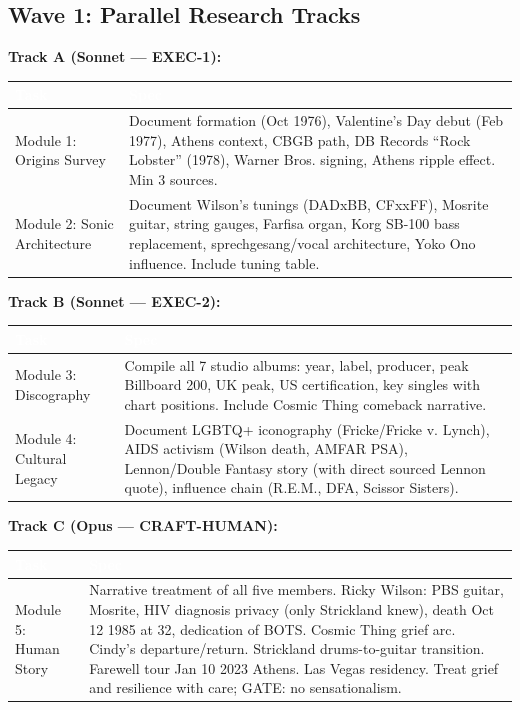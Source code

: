 \documentclass[11pt,letterpaper]{article}
\newcommand{\tableheader}[1]{\textbf{\sffamily\textcolor{white}{#1}}}
\begin{document}
\subsection{Wave 1: Parallel Research Tracks}

\textbf{Track A (Sonnet --- EXEC-1):}

\begin{center}
\begin{tabularx}{\textwidth}{L{3cm}X}
\toprule
{}
\tableheader{Task} & \tableheader{Spec} \\
\midrule
Module 1: Origins Survey & Document formation (Oct 1976), Valentine's Day debut (Feb 1977), Athens context, CBGB path, DB Records ``Rock Lobster'' (1978), Warner Bros. signing, Athens ripple effect. Min 3 sources. \\
Module 2: Sonic Architecture & Document Wilson's tunings (DADxBB, CFxxFF), Mosrite guitar, string gauges, Farfisa organ, Korg SB-100 bass replacement, sprechgesang/vocal architecture, Yoko Ono influence. Include tuning table. \\
\bottomrule
\end{tabularx}
\end{center}

\textbf{Track B (Sonnet --- EXEC-2):}

\begin{center}
\begin{tabularx}{\textwidth}{L{3cm}X}
\toprule
{}
\tableheader{Task} & \tableheader{Spec} \\
\midrule
Module 3: Discography & Compile all 7 studio albums: year, label, producer, peak Billboard 200, UK peak, US certification, key singles with chart positions. Include Cosmic Thing comeback narrative. \\
Module 4: Cultural Legacy & Document LGBTQ+ iconography (Fricke/Fricke v. Lynch), AIDS activism (Wilson death, AMFAR PSA), Lennon/Double Fantasy story (with direct sourced Lennon quote), influence chain (R.E.M., DFA, Scissor Sisters). \\
\bottomrule
\end{tabularx}
\end{center}

\textbf{Track C (Opus --- CRAFT-HUMAN):}

\begin{center}
\begin{tabularx}{\textwidth}{L{3cm}X}
\toprule
{}
\tableheader{Task} & \tableheader{Spec} \\
\midrule
Module 5: Human Story & Narrative treatment of all five members. Ricky Wilson: PBS guitar, Mosrite, HIV diagnosis privacy (only Strickland knew), death Oct 12 1985 at 32, dedication of BOTS. Cosmic Thing grief arc. Cindy's departure/return. Strickland drums-to-guitar transition. Farewell tour Jan 10 2023 Athens. Las Vegas residency. Treat grief and resilience with care; GATE: no sensationalism. \\
\bottomrule
\end{tabularx}
\end{center}
\end{document}
